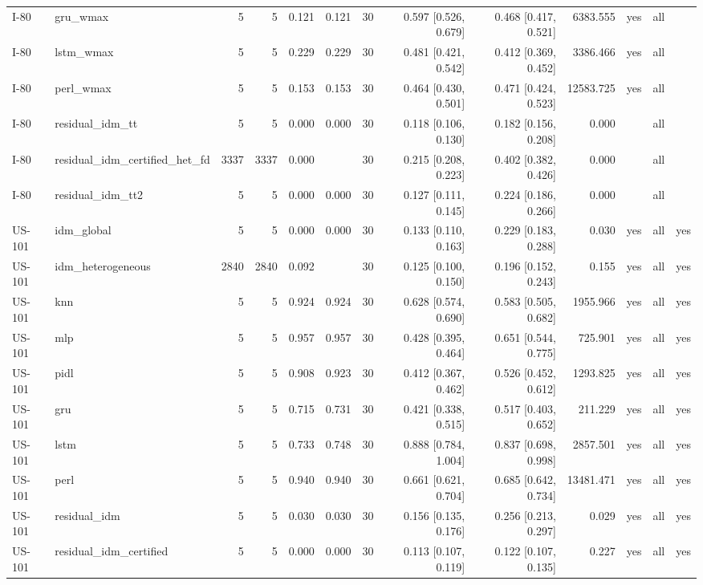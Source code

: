 \begin{table}[htbp]
{\begin{tabular}{llrrrrrrrrlll}
I-80 & gru\_wmax & 5 & 5 & 0.121 & 0.121 & 30 & 0.597 [0.526, 0.679] & 0.468 [0.417, 0.521] & 6383.555 & yes & all &  \\
I-80 & lstm\_wmax & 5 & 5 & 0.229 & 0.229 & 30 & 0.481 [0.421, 0.542] & 0.412 [0.369, 0.452] & 3386.466 & yes & all &  \\
I-80 & perl\_wmax & 5 & 5 & 0.153 & 0.153 & 30 & 0.464 [0.430, 0.501] & 0.471 [0.424, 0.523] & 12583.725 & yes & all &  \\
I-80 & residual\_idm\_tt & 5 & 5 & 0.000 & 0.000 & 30 & 0.118 [0.106, 0.130] & 0.182 [0.156, 0.208] & 0.000 &  & all &  \\
I-80 & residual\_idm\_certified\_het\_fd & 3337 & 3337 & 0.000 &  & 30 & 0.215 [0.208, 0.223] & 0.402 [0.382, 0.426] & 0.000 &  & all &  \\
I-80 & residual\_idm\_tt2 & 5 & 5 & 0.000 & 0.000 & 30 & 0.127 [0.111, 0.145] & 0.224 [0.186, 0.266] & 0.000 &  & all &  \\
US-101 & idm\_global & 5 & 5 & 0.000 & 0.000 & 30 & 0.133 [0.110, 0.163] & 0.229 [0.183, 0.288] & 0.030 & yes & all & yes \\
US-101 & idm\_heterogeneous & 2840 & 2840 & 0.092 &  & 30 & 0.125 [0.100, 0.150] & 0.196 [0.152, 0.243] & 0.155 & yes & all & yes \\
US-101 & knn & 5 & 5 & 0.924 & 0.924 & 30 & 0.628 [0.574, 0.690] & 0.583 [0.505, 0.682] & 1955.966 & yes & all & yes \\
US-101 & mlp & 5 & 5 & 0.957 & 0.957 & 30 & 0.428 [0.395, 0.464] & 0.651 [0.544, 0.775] & 725.901 & yes & all & yes \\
US-101 & pidl & 5 & 5 & 0.908 & 0.923 & 30 & 0.412 [0.367, 0.462] & 0.526 [0.452, 0.612] & 1293.825 & yes & all & yes \\
US-101 & gru & 5 & 5 & 0.715 & 0.731 & 30 & 0.421 [0.338, 0.515] & 0.517 [0.403, 0.652] & 211.229 & yes & all & yes \\
US-101 & lstm & 5 & 5 & 0.733 & 0.748 & 30 & 0.888 [0.784, 1.004] & 0.837 [0.698, 0.998] & 2857.501 & yes & all & yes \\
US-101 & perl & 5 & 5 & 0.940 & 0.940 & 30 & 0.661 [0.621, 0.704] & 0.685 [0.642, 0.734] & 13481.471 & yes & all & yes \\
US-101 & residual\_idm & 5 & 5 & 0.030 & 0.030 & 30 & 0.156 [0.135, 0.176] & 0.256 [0.213, 0.297] & 0.029 & yes & all & yes \\
US-101 & residual\_idm\_certified & 5 & 5 & 0.000 & 0.000 & 30 & 0.113 [0.107, 0.119] & 0.122 [0.107, 0.135] & 0.227 & yes & all & yes \\

\end{tabular}}
\end{table}

